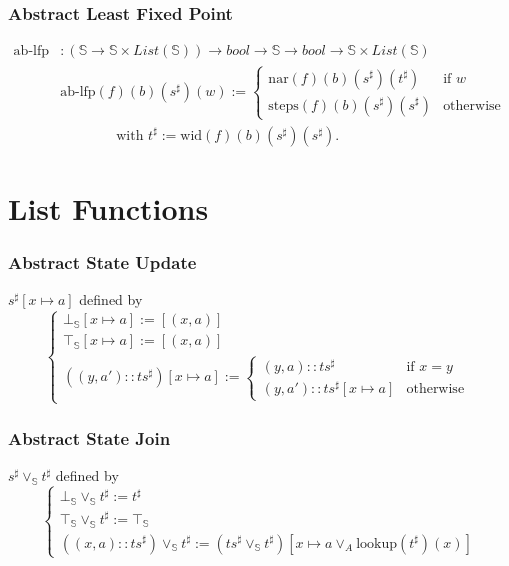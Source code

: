 \documentclass{beamer}
\begin{document}
        \begin{frame}
            \frametitle{Abstract Least Fixed Point}
            \begin{align*}
                \text{ab-lfp} &: (\mathbb{S} \to \mathbb{S} \times List(\mathbb{S})) \to bool \to \mathbb{S} \to bool \to \mathbb{S} \times List(\mathbb{S}) \\
                &\text{ab-lfp} (f) (b) (s^{\sharp}) (w) := \begin{cases}
                                                        \text{nar} (f) (b) (s^{\sharp}) (t^{\sharp})  & \text{if } w \\
                                                        \text{steps} (f) (b) (s^{\sharp}) (s^{\sharp}) & \text{otherwise}
                                                        \end{cases} \\
                & \qquad \qquad \text{with } t^{\sharp} := \text{wid} (f) (b) (s^{\sharp}) (s^{\sharp}).
            \end{align*}
            
        \end{frame}
        
\section{List Functions}



\begin{frame}
    \frametitle{Abstract State Update}
    \( s^{\sharp}[x \mapsto a] \) defined by
    \[ 
        \begin{cases}
            \bot_\mathbb{S}[x \mapsto a] := [(x, a)] \\
            \top_\mathbb{S}[x \mapsto a] := [(x, a)] \\
            ((y, a') :: ts^{\sharp})[x \mapsto a] := \begin{cases}
                (y, a) :: {ts}^{\sharp} & \text{if } x = y \\
                (y, a') :: ts^{\sharp}[x \mapsto a] & \text{otherwise}
                \end{cases}
                                        \end{cases}
    \]
\end{frame}


\begin{frame}
    \frametitle{Abstract State Join}
    \( s^{\sharp} \vee_\mathbb{S} t^{\sharp}\) defined by
    \[
    \begin{cases}
        \bot_\mathbb{S} \vee_\mathbb{S} t^{\sharp} := t^{\sharp} \\  
        \top_\mathbb{S} \vee_\mathbb{S} t^{\sharp} := \top_\mathbb{S} \\
        ((x, a) :: {ts}^{\sharp}) \vee_\mathbb{S} t^{\sharp} := ({ts}^{\sharp} \vee_\mathbb{S} t^{\sharp})[x \mapsto a \vee_A \text{lookup} (t^{\sharp}) (x)]
                                                    \end{cases} \]
\end{frame}
\end{document}

